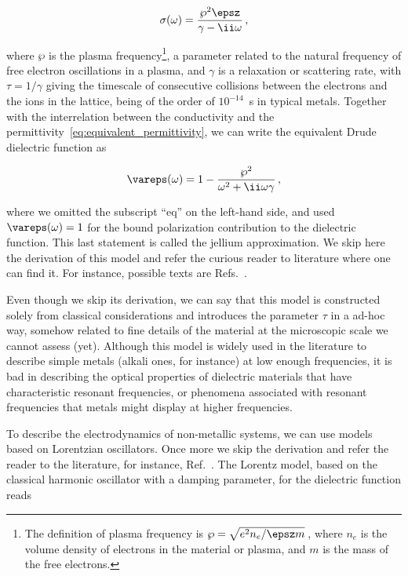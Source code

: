 \begin{equation}
\label{eq:Drude_conductivity}
    \sigma(\omega) = \frac{\wp^2 \epsz}{\gamma - \ii \omega}\,,
\end{equation}

\noindent where $\wp$ is the plasma frequency\footnote{The definition of plasma frequency is $\wp = \sqrt{e^2 n_{e}/\epsz m}$\,, where $n_{e}$ is the volume density of electrons in the material or plasma, and $m$ is the mass of the free electrons.}, a parameter related to the natural frequency of free electron oscillations in a plasma, and $\gamma$ is a relaxation or scattering rate, with $\tau = 1/\gamma$ giving the timescale of consecutive collisions between the electrons and the ions in the lattice, being of the order of $10^{-14}$~\unit{\second} in typical metals.
Together with the interrelation between the conductivity and the permittivity~\eqref{eq:equivalent_permittivity}, we can write the equivalent Drude dielectric function as

\begin{equation}
\label{eq:Drude_dielectric_function}
    \vareps(\omega) = 1 - \frac{\wp^2}{\omega^2 + \ii \omega \gamma}\,,
\end{equation}

\noindent where we omitted the subscript \enquote{$\text{eq}$} on the left-hand side, and used $\vareps(\omega) = 1$ for the bound polarization contribution to the dielectric function.
This last statement is called the jellium approximation.
We skip here the derivation of this model and refer the curious reader to literature where one can find it.
For instance, possible texts are Refs.~\cite{GoncalvesPeres:2016,Simon_Oxford_2013,Ashcroft_Mermin}.

Even though we skip its derivation, we can say that this model is constructed solely from classical considerations and introduces the parameter $\tau$ in a ad-hoc way, somehow related to fine details of the material at the microscopic scale we cannot assess (yet).
Although this model is widely used in the literature to describe simple metals (alkali ones, for instance) at low enough frequencies, it is bad in describing the optical properties of dielectric materials that have characteristic resonant frequencies, or phenomena associated with resonant frequencies that metals might display at higher frequencies.

To describe the electrodynamics of non-metallic systems, we can use models based on Lorentzian oscillators.
Once more we skip the derivation and refer the reader to the literature, for instance, Ref.~\cite{Jackson:electrodynamics}.
The Lorentz model, based on the classical harmonic oscillator with a damping parameter, for the dielectric function reads

